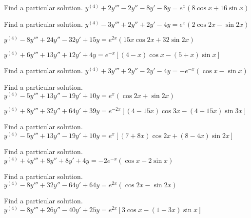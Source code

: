 \documentclass{ximera}
\begin{document}
\begin{problem}\label{exer:9.3.37}   Find a particular solution.   $y^{(4)}+2y'''-2y''-8y'-8y=e^x(8\cos
x+16\sin x)$
\end{problem}

\begin{problem}\label{exer:9.3.38}   Find a particular solution.   $y^{(4)}-3y'''+2y''+2y'-4y=e^x(2\cos2x
-\sin2x)$
\end{problem}

\begin{problem}\label{exer:9.3.39}
$y^{(4)}-8y'''+24y''-32y'+15y=e^{2x}(15x\cos2x+32\sin2x)$
\end{problem}

\begin{problem}\label{exer:9.3.40}
$y^{(4)}+6y'''+13y''+12y'+4y=e^{-x}[(4-x)\cos x-(5+x)\sin x]$
\end{problem}

\begin{problem}\label{exer:9.3.41}   Find a particular solution.   $y^{(4)}+3y'''+2y''-2y'-4y=-e^{-x}
(\cos x-\sin x)$
\end{problem}

\begin{problem}\label{exer:9.3.42}   Find a particular solution.   $y^{(4)}-5y'''+13y''-19y'+10y=e^x
(\cos2x+\sin2x)$
\end{problem}

\begin{problem}\label{exer:9.3.43}
$y^{(4)}+8y'''+32y''+64y'+39y=e^{-2x}[(4-15x)\cos3x-(4+15x)\sin
3x]$
\end{problem}

\begin{problem}\label{exer:9.3.44}   Find a particular solution.   $y^{(4)}-5y'''+13y''-19y'+10y=e^x[(7+8x)\cos
2x+(8-4x)\sin2x]$
\end{problem}

\begin{problem}\label{exer:9.3.45}   Find a particular solution.   $y^{(4)}+4y'''+8y''+8y'+4y=-2e^{-x}
(\cos x-2\sin x)$
\end{problem}

\begin{problem}\label{exer:9.3.46}   Find a particular solution.   $y^{(4)}-8y'''+32y''-64y'+64y=e^{2x}
(\cos2x-\sin2x)$
\end{problem}

\begin{problem}\label{exer:9.3.47}   Find a particular solution.   $y^{(4)}-8y'''+26y''-40y'+25y=e^{2x}[3\cos
x-(1+3x)\sin x]$
\end{problem}
\end{document}
